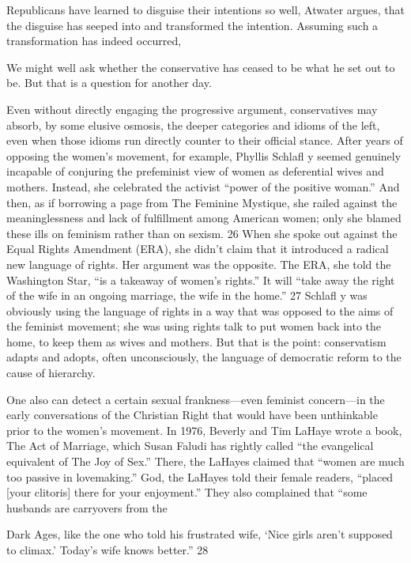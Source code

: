  \par 
Republicans have learned to disguise their intentions so well, Atwater argues, that the disguise has seeped into and transformed the intention. Assuming such a transformation has indeed occurred,
 \par 
We might well ask whether the conservative has ceased to be what he set out to be. But that is a question for another day.
 \par 
Even without directly engaging the progressive argument, conservatives may absorb, by some elusive osmosis, the deeper categories and idioms of the left, even when those idioms run directly counter to their official stance. After years of opposing the women’s movement, for example, Phyllis Schlafl y seemed genuinely incapable of conjuring the prefeminist view of women as deferential wives and mothers. Instead, she celebrated the activist “power of the positive woman.” And then, as if borrowing a page from The Feminine Mystique, she railed against the meaninglessness and lack of fulfillment among American women; only she blamed these ills on feminism rather than on sexism. 26 When she spoke out against the Equal Rights Amendment (ERA), she didn’t claim that it introduced a radical new language of rights. Her argument was the opposite. The ERA, she told the Washington Star, “is a takeaway of women’s rights.” It will “take away the right of the wife in an ongoing marriage, the wife in the home.” 27 Schlafl y was obviously using the language of rights in a way that was opposed to the aims of the feminist movement; she was using rights talk to put women back into the home, to keep them as wives and mothers. But that is the point: conservatism adapts and adopts, often unconsciously, the language of democratic reform to the cause of hierarchy.
 \par 
One also can detect a certain sexual frankness—even feminist concern—in the early conversations of the Christian Right that would have been unthinkable prior to the women’s movement. In 1976, Beverly and Tim LaHaye wrote a book, The Act of Marriage, which Susan Faludi has rightly called “the evangelical equivalent of The Joy of Sex.” There, the LaHayes claimed that “women are much too passive in lovemaking.” God, the LaHayes told their female readers, “placed [your clitoris] there for your enjoyment.” They also complained that “some husbands are carryovers from the
 \par 
Dark Ages, like the one who told his frustrated wife, ‘Nice girls aren’t supposed to climax.’ Today’s wife knows better.” 28
